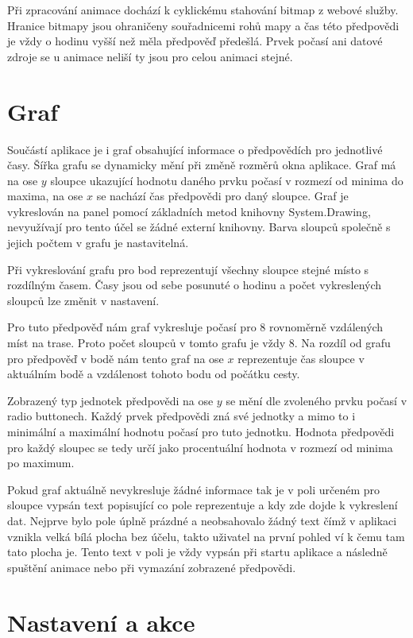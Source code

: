 \documentclass[czech,bachelor,dept460,male,csharp,cpdeclaration]{diploma}
\begin{document}
	Při zpracování animace dochází k cyklickému stahování bitmap z webové služby. Hranice bitmapy jsou ohraničeny souřadnicemi rohů mapy a čas této předpovědi je vždy o hodinu vyšší než měla předpověď předešlá. Prvek počasí ani datové zdroje se u animace neliší ty jsou pro celou animaci stejné.
	
	\section{Graf}
	
	Součástí aplikace je i graf obsahující informace o předpovědích pro jednotlivé časy. Šířka grafu se dynamicky mění při změně rozměrů okna aplikace. Graf má na ose $y$ sloupce ukazující hodnotu daného prvku počasí v rozmezí od minima do maxima, na ose $x$ se nachází čas předpovědi pro daný sloupce. Graf je vykreslován na panel pomocí základních metod knihovny System.Drawing, nevyužívají pro tento účel se žádné externí knihovny. Barva sloupců společně s jejich počtem v grafu je nastavitelná.
	
	Při vykreslování grafu pro bod reprezentují všechny sloupce stejné místo s rozdílným časem. Časy jsou od sebe posunuté o hodinu a počet vykreslených sloupců lze změnit v nastavení.
	
	Pro tuto předpověď nám graf vykresluje počasí pro 8 rovnoměrně vzdálených míst na trase. Proto počet sloupců v tomto grafu je vždy 8. Na rozdíl od grafu pro předpověď v bodě nám tento graf na ose $x$ reprezentuje čas sloupce v aktuálním bodě a vzdálenost tohoto bodu od počátku cesty.
	
	Zobrazený typ jednotek předpovědi na ose $y$ se mění dle zvoleného prvku počasí v radio buttonech. Každý prvek předpovědi zná své jednotky a mimo to i minimální a maximální hodnotu počasí pro tuto jednotku. Hodnota předpovědi pro každý sloupec se tedy určí jako procentuální hodnota v rozmezí od minima po maximum.
	
	Pokud graf aktuálně nevykresluje žádné informace tak je v poli určeném pro sloupce vypsán text popisující co pole reprezentuje a kdy zde dojde k vykreslení dat. Nejprve bylo pole úplně prázdné a neobsahovalo žádný text čímž v aplikaci vznikla velká bílá plocha bez účelu, takto uživatel na první pohled ví k čemu tam tato plocha je. Tento text v poli je vždy vypsán při startu aplikace a následně spuštění animace nebo při vymazání zobrazené předpovědi.
	
	\section{Nastavení a akce}
	
\end{document}
